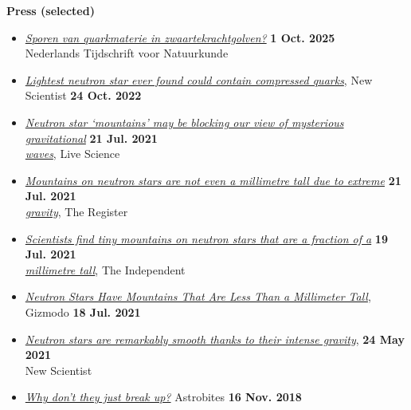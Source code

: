 \documentclass[%
    margin,
    line,
]{res}
\begin{document}
\begin{resume}
\textbf{Press (selected)}
\vspace*{.05in}
\begin{itemize}
    \item[]
    \href{https://www.ntvn.nl/2025/10/sporen-van-quarkmaterie-zwaartekrachtgolven/}%
    {\textit{Sporen van quarkmaterie in zwaartekrachtgolven?}}
    \hfill \textbf{1 Oct. 2025} \\
    Nederlands Tijdschrift voor Natuurkunde
    \item[]
    \href{https://www.newscientist.com/article/2343788-lightest-neutron-star-ever-found-could-contain-compressed-quarks/}%
    {\textit{Lightest neutron star ever found could contain compressed quarks}},
    New Scientist \hfill \textbf{24 Oct. 2022}
    \item[]
    \href{https://www.livescience.com/millimeter-tall-neutron-star-mountains.html}%
    {\textit{Neutron star `mountains' may be blocking our view of mysterious gravitational}}
    \hfill \textbf{21 Jul. 2021} \\
    \href{https://www.livescience.com/millimeter-tall-neutron-star-mountains.html}%
    {\textit{waves}}, Live Science
    \item[]
    \href{https://www.theregister.com/2021/07/21/mountain_neutron_stars/}%
    {\textit{Mountains on neutron stars are not even a millimetre tall due to extreme}}
    \hfill \textbf{21 Jul. 2021} \\
    \href{https://www.theregister.com/2021/07/21/mountain_neutron_stars/}%
    {\textit{gravity}}, The Register
    \item[]
    \href{https://www.independent.co.uk/space/neutron-stars-mountains-ligo-virgo-b1886426.html}%
    {\textit{Scientists find tiny mountains on neutron stars that are a fraction of a}}
    \hfill \textbf{19 Jul. 2021} \\
    \href{https://www.independent.co.uk/space/neutron-stars-mountains-ligo-virgo-b1886426.html}%
    {\textit{millimetre tall}}, The Independent
    \item[]
    \href{https://gizmodo.com/neutron-stars-have-mountains-that-are-less-than-a-milli-1847309049}%
    {\textit{Neutron Stars Have Mountains That Are Less Than a Millimeter Tall}},
    Gizmodo \hfill \textbf{18 Jul. 2021}
    \item[]
    \href{https://www.newscientist.com/article/2278363-neutron-stars-are-remarkably-smooth-thanks-to-their-intense-gravity/}%
    {\textit{Neutron stars are remarkably smooth thanks to their intense gravity}},
    \hfill \textbf{24 May 2021} \\
    New Scientist
    \item[]
    \href{https://astrobites.org/2018/11/16/ns_breakup/}%
    {\textit{Why don’t they just break up?}}
    Astrobites \hfill \textbf{16 Nov. 2018}
\end{itemize}


\end{resume}
\end{document}
